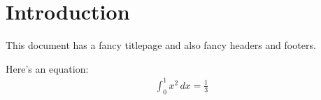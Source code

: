 \documentclass[12pt,twoside]{article}
\begin{document}



\thispagestyle{empty}
\tableofcontents
\setcounter{page}{0}
\clearpage


\section*{Introduction}

This document has a fancy titlepage and also fancy headers and footers.

Here's an equation:
\begin{align}
    \int_{0}^{1} x^2 \, dx = \frac{1}{3}
\end{align}
\end{document}
